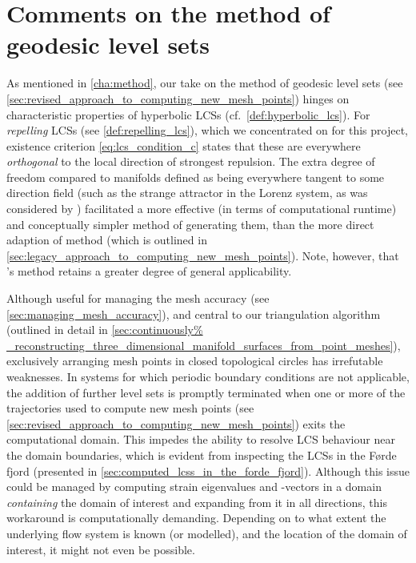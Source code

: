 \section{Comments on the method of geodesic level sets}
\label{sec:comments_on_the_method_of_geodesic_level_sets}
%
As mentioned in \cref{cha:method}, our take on the method of geodesic level
sets (see \cref{sec:revised_approach_to_computing_new_mesh_points}) hinges on
characteristic properties of hyperbolic LCSs (cf.\ \cref{def:hyperbolic_lcs}).
For \emph{repelling} LCSs (see \cref{def:repelling_lcs}), which we concentrated
on for this project, existence criterion \cref{eq:lcs_condition_c} states that
these are everywhere \emph{orthogonal} to the local direction of strongest
repulsion. The extra degree of freedom compared to manifolds defined as being
everywhere tangent to some direction field (such as the strange attractor in
the Lorenz system, as was considered by \textcite{krauskopf2005survey})
facilitated a more effective (in terms of computational runtime) and
conceptually simpler method of generating them, than the more direct adaption
of  method (which is outlined in
\cref{sec:legacy_approach_to_computing_new_mesh_points}). Note, however, that
\citeauthor{krauskopf2005survey}'s method retains a greater degree of
general applicability.

Although useful for managing the mesh accuracy (see
\cref{sec:managing_mesh_accuracy}), and central to our
triangulation algorithm (outlined in detail in \cref{sec:continuously%
_reconstructing_three_dimensional_manifold_surfaces_from_point_meshes}),
exclusively arranging mesh points in closed topological circles has irrefutable
weaknesses. In systems for which periodic boundary conditions are not
applicable, the addition of further level sets is promptly terminated when one
or more of the trajectories used to compute new mesh points (see
\cref{sec:revised_approach_to_computing_new_mesh_points}) exits the
computational domain. This impedes the ability to resolve LCS behaviour near
the domain boundaries, which is evident from inspecting the LCSs in the Førde
fjord (presented in \cref{sec:computed_lcss_in_the_forde_fjord}). Although this
issue could be managed by computing strain eigenvalues and -vectors in a domain
\emph{containing} the domain of interest and expanding from it in all
directions, this workaround is computationally demanding. Depending on to what
extent the underlying flow system is known (or modelled), and the location of
the domain of interest, it might not even be possible.

